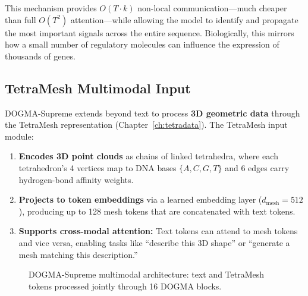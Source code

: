 This mechanism provides $O(T \cdot k)$ non-local communication---much cheaper than full $O(T^2)$ attention---while allowing the model to identify and propagate the most important signals across the entire sequence. Biologically, this mirrors how a small number of regulatory molecules can influence the expression of thousands of genes.

\subsection{TetraMesh Multimodal Input}
\label{sec:tetramesh-input}

DOGMA-Supreme extends beyond text to process \textbf{3D geometric data} through the TetraMesh representation (Chapter~\ref{ch:tetradata}). The TetraMesh input module:

\begin{enumerate}[leftmargin=1.8em]
  \item \textbf{Encodes 3D point clouds} as chains of linked tetrahedra, where each tetrahedron's 4 vertices map to DNA bases $\{A, C, G, T\}$ and 6 edges carry hydrogen-bond affinity weights.
  \item \textbf{Projects to token embeddings} via a learned embedding layer ($d_{\text{mesh}} = 512$), producing up to 128 mesh tokens that are concatenated with text tokens.
  \item \textbf{Supports cross-modal attention:} Text tokens can attend to mesh tokens and vice versa, enabling tasks like ``describe this 3D shape'' or ``generate a mesh matching this description.''
\end{enumerate}

\begin{figure}[H]
\centering
{}
\caption{DOGMA-Supreme multimodal architecture: text and TetraMesh tokens processed jointly through 16 DOGMA blocks.}
\label{fig:v2-multimodal}
\end{figure}

